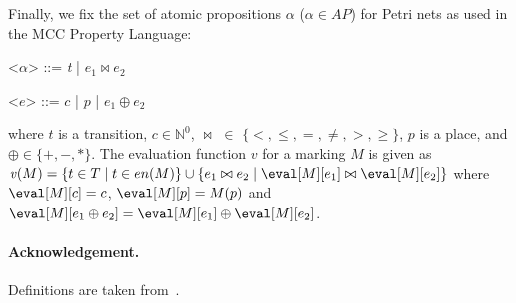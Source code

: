 \documentclass{article}
\newcommand{\en}{\ensuremath{en}\xspace}
\newcommand{\props}{\ensuremath{\mathit{AP}}\xspace}
\newcommand{\apeval}{\ensuremath{\mathit{v}}\xspace}
\begin{document}
Finally, we fix the set of atomic propositions $\alpha$ ($\alpha \in \props$) 
for Petri nets as used in the MCC Property Language:
\begin{grammar}
    \let\syntleft\relax
    \let\syntright\relax
    <$\alpha$> ::= \textit{t} |  $e_1 \bowtie e_2$

    <$e$> ::= $c$ | $p$ | $e_1 \oplus e_2$
\end{grammar}
where  $t$ is a transition, $c \in \mathbb{N}^0$, $\bowtie$ $\in$ $\{<, \leq, =, \neq, >, \geq\}$, $p$ is a place, and $\oplus \in \{ +, -, * \}$.
The evaluation function $\apeval$ for a marking $M$ is given as
$\apeval(M) = \{ t \in T \mid t \in \en(M) \} \cup
\{ e_1 \bowtie e_2 \mid \eval[M][e_1] \bowtie \eval[M][e_2]\}$
where $\eval[M][c] = c$, $\eval[M][p] = M(p)$ and
$\eval[M][e_{1} \oplus e_{2}] = \eval[M][e_{1}] \oplus \eval[M][e_{2}]$.

\paragraph{Acknowledgement.} Definitions are taken from~\cite{BDJJS:PN:18}.



\end{document}
